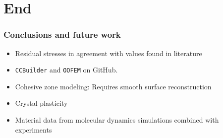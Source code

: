 \documentclass[11pt]{beamer} %
\begin{document}
\section{End}
\begin{frame}
 \frametitle{Conclusions and future work}
 \begin{itemize}
 \item Residual stresses in agreement with values found in literature
 \item \texttt{CCBuilder} and \texttt{OOFEM} on GitHub.
 \end{itemize}

  \begin{itemize}
  \item Cohesive zone modeling: Requires smooth surface reconstruction
  \item Crystal plasticity
  \item Material data from molecular dynamics simulations combined with experiments
 \end{itemize}

\end{frame}
\end{document}
